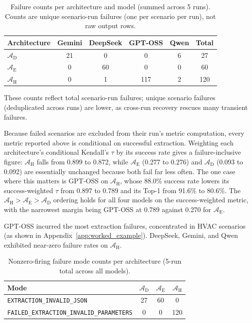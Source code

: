 \documentclass[final,3p,times]{elsarticle}
\begin{document}
\begin{table}[htbp]
\small\centering
\caption{Failure counts per architecture and model (summed across 5 runs). Counts are unique scenario-run failures (one per scenario per run), not raw output rows.}
\label{tab:failure_arch_model}
\begin{tabular}{lccccc}
\toprule
Architecture & Gemini & DeepSeek & GPT-OSS & Qwen & Total \\
\midrule
$\mathcal{A}_{\text{D}}$ & 21 & 0 & 0 & 6 & 27 \\
$\mathcal{A}_{\text{E}}$ & 0 & 60 & 0 & 0 & 60 \\
$\mathcal{A}_{\text{H}}$ & 0 & 1 & 117 & 2 & 120 \\
\bottomrule
\end{tabular}
\end{table}

These counts reflect total scenario-run failures; unique scenario failures (deduplicated across runs) are lower, as cross-run recovery rescues many transient failures.

Because failed scenarios are excluded from their run's metric computation, every metric reported above is conditional on successful extraction. Weighting each architecture's conditional Kendall's $\tau$ by its success rate gives a failure-inclusive figure: $\mathcal{A}_{\text{H}}$ falls from 0.899 to 0.872, while $\mathcal{A}_{\text{E}}$ (0.277 to 0.276) and $\mathcal{A}_{\text{D}}$ (0.093 to 0.092) are essentially unchanged because both fail far less often. The one case where this matters is GPT-OSS on $\mathcal{A}_{\text{H}}$, whose 88.0\% success rate lowers its success-weighted $\tau$ from 0.897 to 0.789 and its Top-1 from 91.6\% to 80.6\%. The $\mathcal{A}_{\text{H}} > \mathcal{A}_{\text{E}} > \mathcal{A}_{\text{D}}$ ordering holds for all four models on the success-weighted metric, with the narrowest margin being GPT-OSS at 0.789 against 0.270 for $\mathcal{A}_{\text{E}}$.

GPT-OSS incurred the most extraction failures, concentrated in HVAC scenarios (as shown in Appendix~\ref{app:worked_example}). DeepSeek, Gemini, and Qwen exhibited near-zero failure rates on $\mathcal{A}_{\text{H}}$.

\begin{table}[htbp]
\small\centering
\caption{Nonzero-firing failure mode counts per architecture (5-run total across all models).\protect\footnotemark}
\label{tab:failure_modes}
\begin{tabular}{lccc}
\toprule
Mode & $\mathcal{A}_{\text{D}}$ & $\mathcal{A}_{\text{E}}$ & $\mathcal{A}_{\text{H}}$ \\
\midrule
\texttt{EXTRACTION\_INVALID\_JSON} & 27 & 60 & 0 \\
\texttt{FAILED\_EXTRACTION\_INVALID\_PARAMETERS} & 0 & 0 & 120 \\
\bottomrule
\end{tabular}
\end{table}
\end{document}
